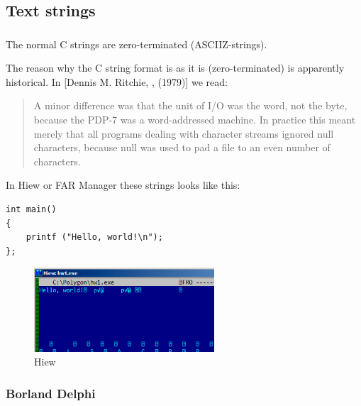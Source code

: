 \subsection{Text strings}

\subsubsection{\CCpp}

\label{C_strings}
The normal C strings are zero-terminated (\ac{ASCIIZ}-strings).

The reason why the C string format is as it is (zero-terminated) is apparently historical.
In [Dennis M. Ritchie, , (1979)]
we read:

\begin{framed}
\begin{quotation}
A minor difference was that the unit of I/O was the word, not the byte, because the PDP-7 was a word-addressed
machine. In practice this meant merely that all programs dealing with character streams ignored null
characters, because null was used to pad a file to an even number of characters.
\end{quotation}
\end{framed}


In Hiew or FAR Manager these strings looks like this:

\begin{lstlisting}
int main()
{
	printf ("Hello, world!\n");
};
\end{lstlisting}

\begin{figure}[H]
\centering
\includegraphics[width=0.6\textwidth]{digging_into_code/strings/C-string.png}
\caption{Hiew}
\end{figure}


\subsubsection{Borland Delphi}

